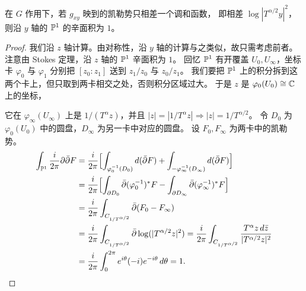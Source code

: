 \begin{claim}\label{clm:area-one}
在 $G$ 作用下，若 $g_{xy}$ 映到的凯勒势只相差一个调和函数，
即相差 $\log|T^{\alpha/2}y|^2$，则沿 $y$ 轴的 $\mathbb{P}^1$ 的辛面积为 $1$。
\end{claim}

\begin{proof}
我们沿 $z$ 轴计算。由对称性，沿 $y$ 轴的计算与之类似，故只需考虑前者。
注意由 Stokes 定理，沿 $z$ 轴的 $\mathbb{P}^1$ 辛面积为 $1$。
回忆 $\mathbb{P}^1$ 有开覆盖 $U_0,U_\infty$，坐标卡 $\varphi_0$ 与 $\varphi_1$
分别把 $[z_0:z_1]$ 送到 $z_1/z_0$ 与 $z_0/z_1$。
我们要把 $\mathbb{P}^1$ 上的积分拆到这两个卡上，但只取到两卡相交之处，否则积分区域过大。
于是 $z$ 是 $\varphi_0(U_0)\cong\mathbb{C}$ 上的坐标，

它在 $\varphi_\infty(U_\infty)$ 上是 $1/(T^\alpha z)$，并且
$|z|=|1/T^\alpha z|\Longrightarrow|z|=1/T^{\alpha/2}$。
令 $D_0$ 为 $\varphi_0(U_0)$ 中的圆盘，$D_\infty$ 为另一卡中对应的圆盘。
设 $F_0,F_\infty$ 为两卡中的凯勒势。
\begin{align*}
\int_{\mathbb{P}^1}\frac{i}{2\pi}\partial\bar\partial F
&=\frac{i}{2\pi}\Bigl[\int_{\varphi_0^{-1}(D_0)}d(\bar\partial F)
 +\int_{-\varphi_\infty^{-1}(D_\infty)}d(\bar\partial F)\Bigr]\\
&=\frac{i}{2\pi}\Bigl[\int_{\partial D_0}\bar\partial(\varphi_0^{-1})^*F
 -\int_{\partial D_\infty}\bar\partial(\varphi_\infty^{-1})^*F\Bigr]\\
&=\frac{i}{2\pi}\int_{C_{1/T^{\alpha/2}}}\bar\partial(F_0-F_\infty)\\
&=\frac{i}{2\pi}\int_{C_{1/T^{\alpha/2}}}\bar\partial\log(|T^{\alpha/2}z|^2)
 =\frac{i}{2\pi}\int_{C_{1/T^{\alpha/2}}}\frac{T^\alpha z\,d\bar z}{|T^{\alpha/2}z|^2}\\
&=\frac{i}{2\pi}\int_0^{2\pi}e^{i\theta}(-i)e^{-i\theta}\,d\theta=1.
\end{align*}
\end{proof}


